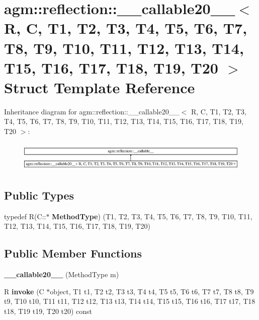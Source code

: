 \hypertarget{structagm_1_1reflection_1_1____callable20____}{}\section{agm\+:\+:reflection\+:\+:\+\_\+\+\_\+callable20\+\_\+\+\_\+$<$ R, C, T1, T2, T3, T4, T5, T6, T7, T8, T9, T10, T11, T12, T13, T14, T15, T16, T17, T18, T19, T20 $>$ Struct Template Reference}
\label{structagm_1_1reflection_1_1____callable20____}
Inheritance diagram for agm\+:\+:reflection\+:\+:\+\_\+\+\_\+callable20\+\_\+\+\_\+$<$ R, C, T1, T2, T3, T4, T5, T6, T7, T8, T9, T10, T11, T12, T13, T14, T15, T16, T17, T18, T19, T20 $>$\+:\begin{figure}[H]
\begin{center}
\leavevmode
\includegraphics[height=1.434059cm]{structagm_1_1reflection_1_1____callable20____}
\end{center}
\end{figure}
\subsection*{Public Types}
\begin{DoxyCompactItemize}
\item 
typedef R(C\+::$\ast$ {\bfseries Method\+Type}) (T1, T2, T3, T4, T5, T6, T7, T8, T9, T10, T11, T12, T13, T14, T15, T16, T17, T18, T19, T20)\hypertarget{structagm_1_1reflection_1_1____callable20_____a34159eb9fe57fb25758f09f921ed555f}{}\label{structagm_1_1reflection_1_1____callable20_____a34159eb9fe57fb25758f09f921ed555f}

\end{DoxyCompactItemize}
\subsection*{Public Member Functions}
\begin{DoxyCompactItemize}
\item 
{\bfseries \+\_\+\+\_\+callable20\+\_\+\+\_\+} (Method\+Type m)\hypertarget{structagm_1_1reflection_1_1____callable20_____aaa5b3e2b1704b21e17dd832373758fe6}{}\label{structagm_1_1reflection_1_1____callable20_____aaa5b3e2b1704b21e17dd832373758fe6}

\item 
R {\bfseries invoke} (C $\ast$object, T1 t1, T2 t2, T3 t3, T4 t4, T5 t5, T6 t6, T7 t7, T8 t8, T9 t9, T10 t10, T11 t11, T12 t12, T13 t13, T14 t14, T15 t15, T16 t16, T17 t17, T18 t18, T19 t19, T20 t20) const \hypertarget{structagm_1_1reflection_1_1____callable20_____a499ddf5d70e7c79183f5facbe5c822b7}{}\label{structagm_1_1reflection_1_1____callable20_____a499ddf5d70e7c79183f5facbe5c822b7}

\end{DoxyCompactItemize}
